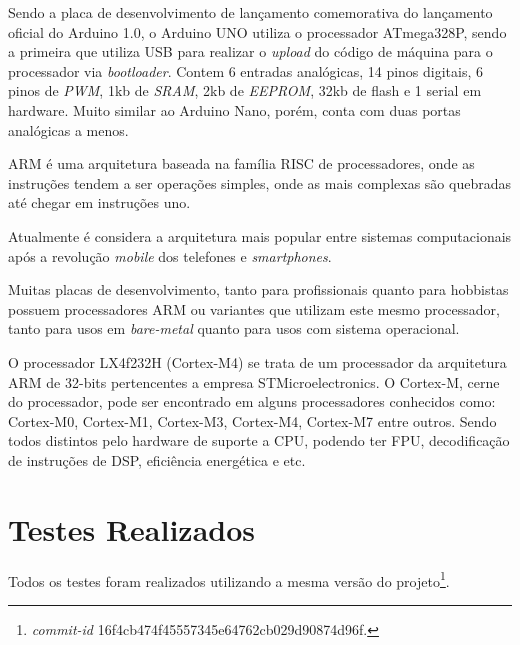 Sendo a placa de desenvolvimento de lançamento comemorativa do lançamento oficial do Arduino 1.0, o Arduino UNO utiliza o processador ATmega328P, sendo a primeira que utiliza USB para realizar o \textit{upload} do código de máquina para o processador via \textit{bootloader}. Contem 6 entradas analógicas, 14 pinos digitais, 6 pinos de \textit{PWM}, 1kb de \textit{SRAM}, 2kb de \textit{EEPROM}, 32kb de flash e 1 serial em hardware. Muito similar ao Arduino Nano, porém, conta com duas portas analógicas a menos.


ARM é uma arquitetura baseada na família RISC de processadores, onde as instruções tendem a ser operações simples, onde as mais complexas são quebradas até chegar em instruções uno.

Atualmente é considera a arquitetura mais popular entre sistemas computacionais após a revolução \textit{mobile} dos telefones e \textit{smartphones}.

Muitas placas de desenvolvimento, tanto para profissionais quanto para hobbistas possuem processadores ARM ou variantes que utilizam este mesmo processador, tanto para usos em \textit{bare-metal} quanto para usos com sistema operacional.


O processador LX4f232H (Cortex-M4) se trata de um processador da arquitetura ARM de 32-bits pertencentes a empresa STMicroelectronics. O Cortex-M, cerne do processador, pode ser encontrado em alguns processadores conhecidos como: Cortex-M0, Cortex-M1, Cortex-M3, Cortex-M4, Cortex-M7 entre outros. Sendo todos distintos pelo hardware de suporte a CPU, podendo ter FPU, decodificação de instruções de DSP, eficiência energética e etc.


\section{Testes Realizados}

Todos os testes foram realizados utilizando a mesma versão do projeto\footnote{\textit{commit-id} 16f4cb474f45557345e64762cb029d90874d96f.}.

